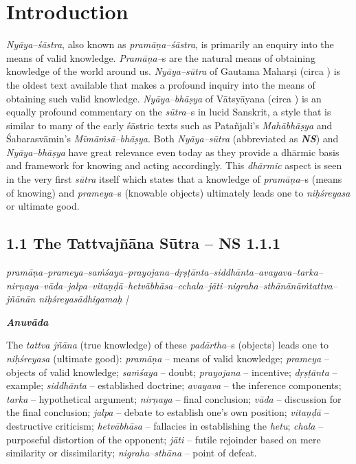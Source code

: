 
\chapter{Introduction}\label{chapter1}

\textit{Nyāya–śāstra}, also known as \textit{pramāṇa–śāstra}, is primarily an enquiry into the means of valid knowledge. \textit{Pramāṇa–}s are the natural means of obtaining knowledge of the world around us. \textit{Nyāya–sūtra} of Gautama Maharṣi (circa ) is the oldest text available that makes a profound inquiry into the means of obtaining such valid knowledge. \textit{Nyāya–bhāṣya} of Vātsyāyana (circa ) is an equally profound commentary on the \textit{sūtra}–s in lucid Sanskrit, a style that is similar to many of the early śāstric texts such as Patañjali’s \textit{Mahābhāṣya} and Śabarasvāmin’s \textit{Mīmāṁsā–bhāṣya}. Both \textit{Nyāya–sūtra }(abbreviated as \textit{\textbf{NS}}) and \textit{Nyāya–bhāṣya} have great relevance even today as they provide a dhārmic basis and framework for knowing and acting accordingly. This \textit{dhārmic} aspect is seen in the very first \textit{sūtra} itself which states that a knowledge of \textit{pramāṇa}–s (means of knowing) and \textit{prameya}–s (knowable objects) ultimately leads one to \textit{niḥśreyasa} or ultimate good.

\section*{1.1 The Tattvajñāna Sūtra – NS 1.1.1}

\begin{myquote}
\textit{pramāṇa–prameya–saṁśaya–prayojana–dṛṣṭānta–siddhānta–avayava–tarka–\break nirṇaya–vāda–jalpa–vitaṇḍā–hetvābhāsa–cchala–jāti–nigraha–sthānānāṁ\break tattva–jñānān niḥśreyasādhigamaḥ |}
\end{myquote}

\textit{\textbf{Anuvāda}}

The \textit{tattva jñāna} (true knowledge) of these \textit{padārtha}–s (objects) leads one to \textit{niḥśreyasa} (ultimate good): \textit{pramāṇa} – means of valid knowledge; \textit{prameya} – objects of valid knowledge; \textit{saṁśaya} – doubt; \textit{prayojana} – incentive; \textit{dṛṣṭānta} – example; \textit{siddhānta} – established doctrine; \textit{avayava} – the inference components; \textit{tarka} – hypothetical argument; \textit{nirṇaya} – final conclusion; \textit{vāda} – discussion for the final conclusion; \textit{jalpa} – debate to establish one’s own position; \textit{vitaṇḍā} – destructive criticism; \textit{hetvābhāsa} – fallacies in establishing the \textit{hetu}; \textit{chala} – purposeful distortion of the opponent; \textit{jāti} – futile rejoinder based on mere similarity or dissimilarity; \textit{nigraha–sthāna} – point of defeat.

